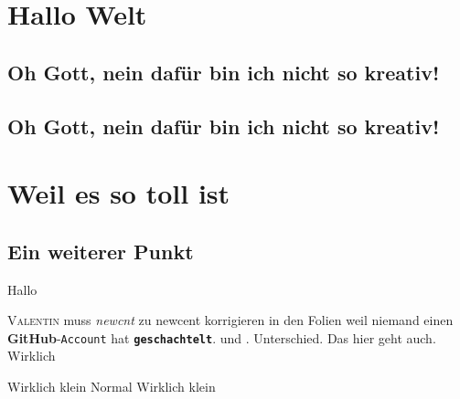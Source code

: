     \section{Hallo Welt}
    \subsection{Oh Gott, nein dafür bin ich nicht so kreativ!}
    \blindtext[1]
    \subsection[omg]{Oh Gott, nein dafür bin ich nicht so kreativ!}
        \blindtext[1]
    \section{Weil es so toll ist}
    \subsection{Ein weiterer Punkt}
    Hallo
    
    
    \textsc{Valentin} muss \textit{newcnt} zu newcent korrigieren in den Folien
    weil niemand einen \textbf{GitHub}-\texttt{Account} hat
    \textbf{\texttt{geschachtelt}}.  und \sffamily. Unterschied. \textsf{Das hier geht auch}. Wirklich
     
    \tiny Wirklich klein
    \normalsize Normal
    \tiny{Wirklich klein}
    
    \normalsize
    \rmfamily
    
    \begin{flushright}
    \blindtext
    \end{flushright}
    \begin{center}
    \blindtext
    \end{center}
    \begin{flushleft}
    \blindtext
    \end{flushleft}
     
